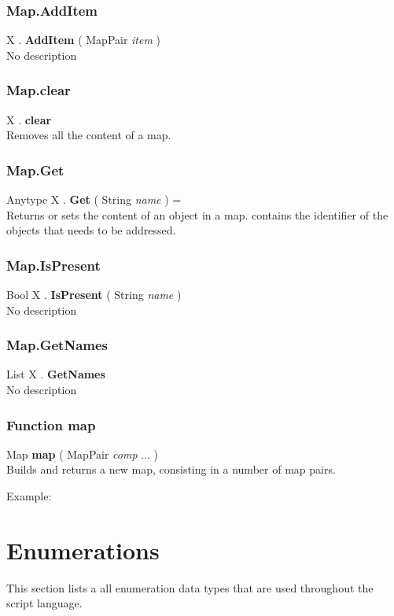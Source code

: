 \subsubsection{Map.AddItem \label{F:Map:AddItem}}
X . \textbf{AddItem} ( MapPair \textit{item} ) \\
No description

\subsubsection{Map.clear \label{F:Map:clear}}
X . \textbf{clear} \\
Removes all the content of a map.

\subsubsection{Map.Get \label{F:Map:Get}}
Anytype X . \textbf{Get} ( String \textit{name} ) = \\
Returns or sets the content of an object in a map.  contains the identifier of the objects that needs to be addressed.

\subsubsection{Map.IsPresent \label{F:Map:IsPresent}}
Bool X . \textbf{IsPresent} ( String \textit{name} ) \\
No description

\subsubsection{Map.GetNames \label{F:Map:GetNames}}
List X . \textbf{GetNames} \\
No description

\subsubsection{Function map \label{F:map}}
Map \textbf{map} ( MapPair \textit{comp} ...  ) \\
Builds and returns a new map, consisting in a number of map pairs.

Example: \\

\section{Enumerations \label{Enumerations}}
This section lists a all enumeration data types that are used throughout the script language.

